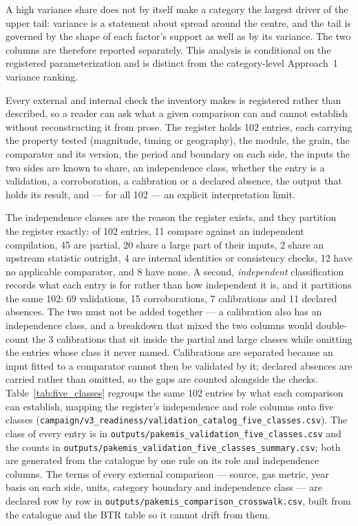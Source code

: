\documentclass[essd]{copernicus}
\begin{document}
A high variance share does not by itself make a category the largest driver of the upper tail: variance is a statement about spread around the centre, and the tail is governed by the shape of each factor's support as well as by its variance. The two columns are therefore reported separately. This analysis is conditional on the registered parameterization and is distinct from the category-level Approach~1 variance ranking.

Every external and internal check the inventory makes is registered rather than described, so a reader can ask what a given comparison can and cannot establish without reconstructing it from prose. The register holds \num{102} entries, each carrying the property tested (magnitude, timing or geography), the module, the grain, the comparator and its version, the period and boundary on each side, the inputs the two sides are known to share, an independence class, whether the entry is a validation, a corroboration, a calibration or a declared absence, the output that holds its result, and --- for all \num{102} --- an explicit interpretation limit.

The independence classes are the reason the register exists, and they partition the register exactly: of \num{102} entries, \num{11} compare against an independent compilation, \num{45} are partial, \num{20} share a large part of their inputs, \num{2} share an upstream statistic outright, \num{4} are internal identities or consistency checks, \num{12} have no applicable comparator, and \num{8} have none. A second, \emph{independent} classification records what each entry is for rather than how independent it is, and it partitions the same \num{102}: \num{69} validations, \num{15} corroborations, \num{7} calibrations and \num{11} declared absences. The two must not be added together --- a calibration also has an independence class, and a breakdown that mixed the two columns would double-count the \num{3} calibrations that sit inside the partial and large classes while omitting the entries whose class it never named. Calibrations are separated because an input fitted to a comparator cannot then be validated by it; declared absences are carried rather than omitted, so the gaps are counted alongside the checks.
Table~\ref{tab:five_classes} regroups the same \num{102} entries by what each comparison can establish, mapping the register's independence and role columns onto five classes (\texttt{campaign/v3\_readiness/validation\_catalog\_five\_classes.csv}).
 The class of every entry is in \texttt{outputs/pakemis\_validation\_five\_classes.csv} and the counts in \texttt{outputs/pakemis\_validation\_five\_classes\_summary.csv}; both are generated from the catalogue by one rule on its role and independence columns. The terms of every external comparison --- source, gas metric, year basis on each side, units, category boundary and independence class --- are declared row by row in \texttt{outputs/pakemis\_comparison\_crosswalk.csv}, built from the catalogue and the BTR table so it cannot drift from them.
\end{document}
